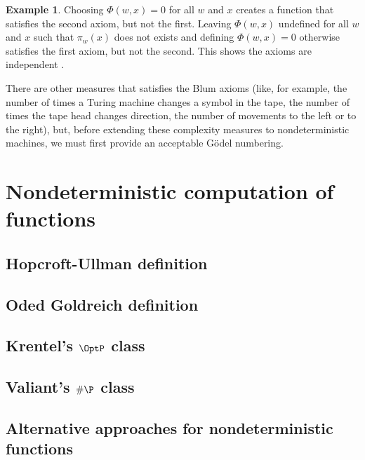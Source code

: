 \documentclass[12pt]{article}
\theoremstyle{definition}
\newtheorem{example}[definition]{Example}
\begin{document}
\begin{example}
    Choosing $\Phi(w, x) = 0$ for all $w$ and $x$
    creates a function that satisfies the second axiom,
    but not the first.
    Leaving $\Phi(w, x)$ undefined for all $w$ and $x$ such that
    $\pi_w(x)$ does not exists and defining $\Phi(w, x) = 0$ otherwise
    satisfies the first axiom, but not the second.
    This shows the axioms are independent \cite[p.~324]{Blum1967}.
\end{example}

There are other measures that satisfies the Blum axioms
(like, for example,
the number of times a Turing machine changes a symbol in the tape,
the number of times the tape head changes direction,
the number of movements to the left or to the right),
but, before extending these complexity measures to nondeterministic machines,
we must first provide an acceptable Gödel numbering.

\section{Nondeterministic computation of functions}

\subsection{Hopcroft-Ullman definition}
\subsection{Oded Goldreich definition}
\subsection{Krentel's $\OptP$ class}
\subsection{Valiant's $\#\P$ class}
\subsection{Alternative approaches for nondeterministic functions}



\end{document}
